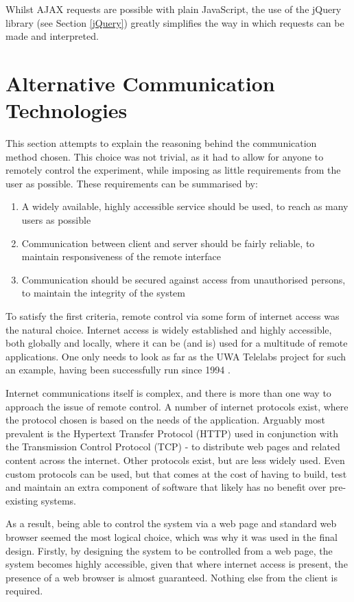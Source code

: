Whilst AJAX requests are possible with plain JavaScript, the use of the jQuery library (see Section \ref{jQuery}) greatly simplifies the way in which requests can be made and interpreted.

\section{Alternative Communication Technologies}\label{Alternative Communication Technologies}

This section attempts to explain the reasoning behind the communication method chosen. This choice was not trivial, as it had to allow for anyone to remotely control the experiment, while imposing as little requirements from the user as possible. These requirements can be summarised by:
\begin{enumerate}
	\item A widely available, highly accessible service should be used, to reach as many users as possible
	\item Communication between client and server should be fairly reliable, to maintain responsiveness of the remote interface
	\item Communication should be secured against access from unauthorised persons, to maintain the integrity of the system
\end{enumerate}

To satisfy the first criteria, remote control via some form of internet access was the natural choice. Internet access is widely established and highly accessible, both globally and locally, where it can be (and is) used for a multitude of remote applications. One only needs to look as far as the UWA Telelabs project for such an example, having been successfully run since 1994 \cite{telelabs}.

Internet communications itself is complex, and there is more than one way to approach the issue of remote control. A number of internet protocols exist, where the protocol chosen is based on the needs of the application. Arguably most prevalent is the Hypertext Transfer Protocol (HTTP)\cite{rfc2616} used in conjunction with the Transmission Control Protocol (TCP) - to distribute web pages and related content across the internet. Other protocols exist, but are less widely used. Even custom protocols can be used, but that comes at the cost of having to build, test and maintain an extra component of software that likely has no benefit over pre-existing systems.

As a result, being able to control the system via a web page and standard web browser seemed the most logical choice, which was why it was used in the final design. Firstly, by designing the system to be controlled from a web page, the system becomes highly accessible, given that where internet access is present, the presence of a web browser is almost guaranteed. Nothing else from the client is required. 

